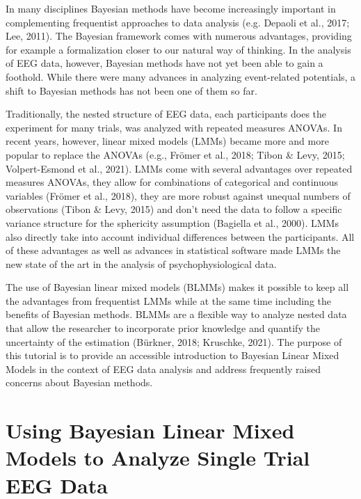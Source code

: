 \documentclass[
  doc,12pt,floatsintext]{apa7}
\begin{document}
In many disciplines Bayesian methods have become increasingly important in complementing frequentist approaches to data analysis (e.g. Depaoli et al., 2017; Lee, 2011). The Bayesian framework comes with numerous advantages, providing for example a formalization closer to our natural way of thinking. In the analysis of EEG data, however, Bayesian methods have not yet been able to gain a foothold. While there were many advances in analyzing event-related potentials, a shift to Bayesian methods has not been one of them so far.

Traditionally, the nested structure of EEG data, each participants does the experiment for many trials, was analyzed with repeated measures ANOVAs. In recent years, however, linear mixed models (LMMs) became more and more popular to replace the ANOVAs (e.g., Frömer et al., 2018; Tibon \& Levy, 2015; Volpert-Esmond et al., 2021). LMMs come with several advantages over repeated measures ANOVAs, they allow for combinations of categorical and continuous variables (Frömer et al., 2018), they are more robust against unequal numbers of observations (Tibon \& Levy, 2015) and don't need the data to follow a specific variance structure for the sphericity assumption (Bagiella et al., 2000). LMMs also directly take into account individual differences between the participants. All of these advantages as well as advances in statistical software made LMMs the new state of the art in the analysis of psychophysiological data.

The use of Bayesian linear mixed models (BLMMs) makes it possible to keep all the advantages from frequentist LMMs while at the same time including the benefits of Bayesian methods. BLMMs are a flexible way to analyze nested data that allow the researcher to incorporate prior knowledge and quantify the uncertainty of the estimation (Bürkner, 2018; Kruschke, 2021). The purpose of this tutorial is to provide an accessible introduction to Bayesian Linear Mixed Models in the context of EEG data analysis and address frequently raised concerns about Bayesian methods.

\section{Using Bayesian Linear Mixed Models to Analyze Single Trial EEG Data}\label{using-bayesian-linear-mixed-models-to-analyze-single-trial-eeg-data}
\end{document}
